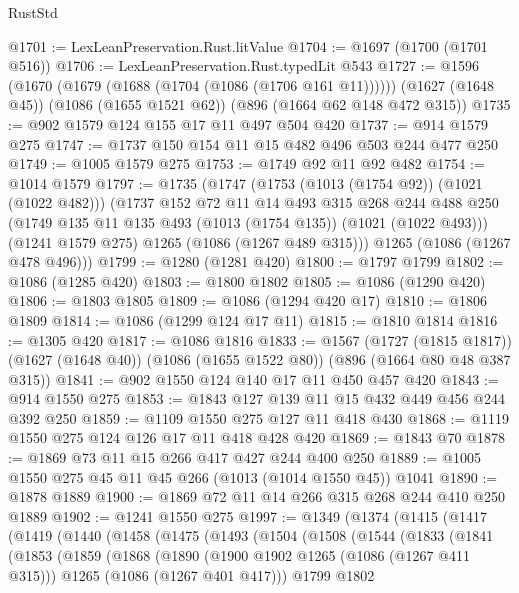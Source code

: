 \begin{lexlean}{RustStd}
\begin{coremodule}
@1701 := LexLeanPreservation.Rust.litValue
@1704 := @1697 (@1700 (@1701 @516))
@1706 := LexLeanPreservation.Rust.typedLit @543
@1727 := @1596
    (@1670 (@1679 (@1688 (@1704 (@1086 (@1706 @161 @11))))))
    (@1627 (@1648 @45))
    (@1086 (@1655 @1521 @62))
    (@896 (@1664 @62 @148 @472 @315))
@1735 := @902 @1579 @124 @155 @17 @11 @497 @504 @420
@1737 := @914 @1579 @275
@1747 := @1737 @150 @154 @11 @15 @482 @496 @503 @244 @477 @250
@1749 := @1005 @1579 @275
@1753 := @1749 @92 @11 @92 @482
@1754 := @1014 @1579
@1797 := @1735
    (@1747
      (@1753 (@1013 (@1754 @92)) (@1021 (@1022 @482)))
      (@1737
        @152
        @72
        @11
        @14
        @493
        @315
        @268
        @244
        @488
        @250
        (@1749 @135 @11 @135 @493 (@1013 (@1754 @135)) (@1021 (@1022 @493)))
        (@1241 @1579 @275)
        @1265
        (@1086 (@1267 @489 @315)))
      @1265
      (@1086 (@1267 @478 @496)))
@1799 := @1280 (@1281 @420)
@1800 := @1797 @1799
@1802 := @1086 (@1285 @420)
@1803 := @1800 @1802
@1805 := @1086 (@1290 @420)
@1806 := @1803 @1805
@1809 := @1086 (@1294 @420 @17)
@1810 := @1806 @1809
@1814 := @1086 (@1299 @124 @17 @11)
@1815 := @1810 @1814
@1816 := @1305 @420
@1817 := @1086 @1816
@1833 := @1567
    (@1727 (@1815 @1817))
    (@1627 (@1648 @40))
    (@1086 (@1655 @1522 @80))
    (@896 (@1664 @80 @48 @387 @315))
@1841 := @902 @1550 @124 @140 @17 @11 @450 @457 @420
@1843 := @914 @1550 @275
@1853 := @1843 @127 @139 @11 @15 @432 @449 @456 @244 @392 @250
@1859 := @1109 @1550 @275 @127 @11 @418 @430
@1868 := @1119 @1550 @275 @124 @126 @17 @11 @418 @428 @420
@1869 := @1843 @70
@1878 := @1869 @73 @11 @15 @266 @417 @427 @244 @400 @250
@1889 := @1005 @1550 @275 @45 @11 @45 @266 (@1013 (@1014 @1550 @45)) @1041
@1890 := @1878 @1889
@1900 := @1869 @72 @11 @14 @266 @315 @268 @244 @410 @250 @1889
@1902 := @1241 @1550 @275
@1997 := @1349
    (@1374
      (@1415
        (@1417
          (@1419
            (@1440
              (@1458
                (@1475
                  (@1493
                    (@1504
                      (@1508
                        (@1544
                          (@1833
                            (@1841
                              (@1853
                                (@1859
                                  (@1868
                                    (@1890
                                      (@1900 @1902 @1265 (@1086 (@1267 @411 @315)))
                                      @1265
                                      (@1086 (@1267 @401 @417)))
                                    @1799
                                    @1802

\end{coremodule}
\end{lexlean}
